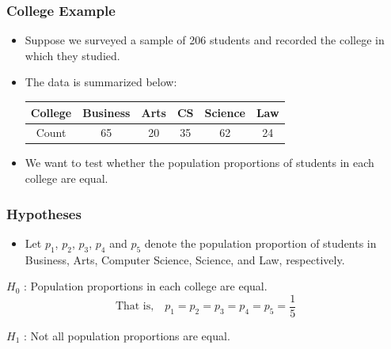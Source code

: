 \documentclass[12pt]{beamer}
\begin{document}
		\begin{frame}
			\frametitle{College Example}
			
			\begin{itemize}[label={\color{blue}$\blacktriangleright$}]
				\item Suppose we surveyed a sample of 206 students and recorded the college in which they studied.
				\item The data is summarized below:
				
				\medskip
				
				\begin{center}
					\begin{tabular}{cccccc}
					\toprule
					College & Business & Arts & CS & Science & Law \\
					\midrule
					Count & 65 & 20 & 35 & 62 & 24 \\
					\bottomrule
				\end{tabular}
			\end{center}
				
				\medskip
				\item We want to test whether the population proportions of students in each college are equal.
			\end{itemize}
			
		\end{frame}
		\begin{frame}
			\frametitle{Hypotheses}
			
			\begin{itemize}[label={\color{blue}$\blacktriangleright$}]
				\item Let $p_1$, $p_2$, $p_3$, $p_4$ and $p_5$ denote the population proportion of students in Business, Arts, Computer Science, Science, and Law, respectively.
			\end{itemize}
			
			\medskip
			
			$H_0$ : Population proportions in each college are equal.
			\[\text{That is,} \quad p_1 = p_2 = p_3 = p_4 = p_5 = \frac{1}{5}\]
			
			$H_1$ : Not all population proportions are equal.
			
		\end{frame}
\end{document}
